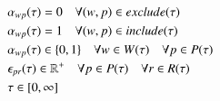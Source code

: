 \begin{alignat}{2}
	& \alpha_{wp}(\tau) = 0 \notag                                                           \quad \forall (w, p) \in exclude(\tau)                                                                                                       \\
	& \alpha_{wp}(\tau) = 1 \notag                                                           \quad \forall (w, p) \in include(\tau)                                                                                                       \\
	& \alpha_{wp}(\tau) \in \{0, 1\} \notag                                                  \quad \forall w \in W(\tau) \quad \forall p \in P(\tau)                                                                                 \\ 
	& \epsilon_{pr}(\tau) \in \mathbb{R}^{+} \notag                                                                                            \quad \forall p \in P(\tau) \quad \forall r \in R(\tau)                                                                                     \\ 
	& \tau \in  [0, \infty] 
\end{alignat}


